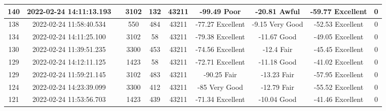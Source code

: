 \begin{longtable*}{|c|c|c|c|c|c|c|c|c|c|}
140&2022-02-24 14:11:13.193&&3102&132&43211& -99.49    Poor        & -20.81    Awful       & -59.77    Excellent   & 0\\\hline
{}138&2022-02-24 11:58:40.534&&550&484&43211& -77.27    Excellent   & -9.15     Very Good   & -52.53    Excellent   & 0\\\hline
{}134&2022-02-24 14:11:25.100&&3102&58&43211& -79.38    Excellent   & -11.67    Good        & -49.05    Excellent   & 0\\\hline
{}130&2022-02-24 11:39:51.235&&3300&453&43211& -74.56    Excellent   & -12.4     Fair        & -45.45    Excellent   & 0\\\hline
{}129&2022-02-24 14:12:11.125&&1423&58&43211& -72.71    Excellent   & -11.18    Good        & -41.02    Excellent   & 0\\\hline
{}129&2022-02-24 11:59:21.145&&3102&483&43211& -90.25    Fair        & -13.23    Fair        & -57.95    Excellent   & 0\\\hline
{}124&2022-02-24 14:23:39.099&&3300&412&43211& -85       Very Good   & -12.79    Fair        & -55.52    Excellent   & 0\\\hline
{}121&2022-02-24 11:53:56.703&&1423&439&43211& -71.34    Excellent   & -10.04    Good        & -41.46    Excellent   & 0\\\hline

\end{longtable*}
